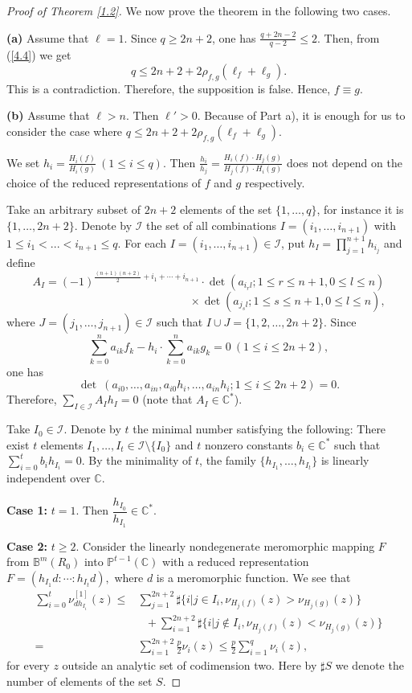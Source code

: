 \documentclass[12pt, a4paper, oneside]{amsart}
\newcommand{\C}{{\mathbb{C}}}
\newcommand{\B}{\mathbb{B}}
\renewcommand{\P}{{\mathbb{P}}}
\numberwithin{equation}{section}
\begin{document}
\begin{proof}[Proof of Theorem \ref{1.2}]
We now prove the theorem in the following two cases.

\noindent
\textbf{(a)} Assume that $\ell=1$. Since $q\ge 2n+2$, one has $\frac{q+2n-2}{q-2}\le 2$. Then, from (\ref{4.4}) we get 
$$q\le 2n+2+2\rho_{f,g}(\ell_f+\ell_g).$$
This is a contradiction. Therefore, the supposition is false. Hence, $f\equiv g$. 

\noindent
\textbf{(b)} Assume that $\ell>n$. Then $\ell'>0$. Because of Part a), it is enough for us to consider the case where $q\le 2n+2+2\rho_{f,g}(\ell_f+\ell_g).$

We set $h_i=\frac {H_i(f)}{H_i(g)}\ (1\le i\le q).$ Then
$\frac {h_i}{h_j} = \frac {H_i(f)\cdot H_j(g)}{H_j(f)\cdot H_i(g)}$
does not depend on the choice of the reduced representations of $f$ and $g$ respectively.

Take an arbitrary subset of $2n+2$ elements of the set $\{1,\ldots,q\}$, for instance it is $\{1,\ldots,2n+2\}$.
Denote by $\mathcal {I}$ the set of all combinations $I=(i_1,\ldots,i_{n+1})$ with $1\le i_1<...<i_{n+1}\le q$. For each $I=(i_1,\ldots,i_{n+1})\in \mathcal {I}$, put $h_I=\prod_{j=1}^{n+1}h_{i_j}$ and define 
$$A_I=(-1)^{\frac {(n+1)(n+2)}{2}+i_1+\cdots+i_{n+1}}\cdot \det (a_{i_rl};1\le r \le n+1,0\le l \le n)$$
$$\quad\quad\quad\quad\quad\quad\quad \quad\quad\quad\quad\quad\quad\quad\times\det (a_{j_sl};1\le s \le n+1,0\le l \le n),$$
where $J=(j_1,\ldots,j_{n+1})\in \mathcal {I}$ such that $I \cup J =\{1,2,\ldots,2n+2\}.$
Since 
$$\sum_{k=0}^n a_{ik}f_{k}-h_i\cdot \sum_{k=0}^n a_{ik}g_{k}=0\ (1\le i \le 2n+2),$$ 
one has
$$\det \ (a_{i0},\ldots,a_{in},a_{i0}h_i,\ldots,a_{in}h_i; 1\le i \le 2n+2)=0.$$
Therefore, $\sum_{I\in \mathcal {I}}A_Ih_I=0$ (note that $A_I\in\C^*$).

Take $I_0\in \mathcal {I}$. Denote by $t$ the minimal number satisfying the following: 
There exist $t$ elements $I_1,\ldots,I_t \in \mathcal {I}\setminus \{I_0\}$ and $t$ nonzero constants $b_i \in 
\C^*$ such that $\sum_{i=0}^tb_ih_{I_i}=0.$
By the minimality of $t$, the family $\{h_{I_1},\ldots,h_{I_t}\}$ is linearly independent over $\C$.

{\bf Case 1:} $t=1$. Then $\dfrac {h_{I_0}}{h_{I_1}}\in\C^*.$

{\bf Case 2:} $t\ge 2.$  Consider the linearly nondegenerate meromorphic mapping $F$ from $\B^m(R_0)$ into $\P^{t-1}(\C)$ with a reduced representation
$F=(h_{I_1}d:\cdots :h_{I_t}d),$ where $d$ is a meromorphic function. We see that
\begin{align*}
\sum_{i=0}^t\nu_{d h_{I_i}}^{[1]}(z)\le&\sum_{j=1}^{2n+2}\sharp\{i|j\in I_i,\nu_{H_j(f)}(z)>\nu_{H_j(g)}(z)\}\\
&\ \ \ +\sum_{i=1}^{2n+2}\sharp\{i|j\not\in I_i,\nu_{H_j(f)}(z)<\nu_{H_j(g)}(z)\}\\
=&\sum_{i=1}^{2n+2}\frac{p}{2}\nu_i(z)\le\frac{p}{2}\sum_{i=1}^q\nu_i(z),
\end{align*}
for every $z$ outside an analytic set of codimension two. Here by $\sharp S$ we denote the number of elements of the set $S$.


\end{proof}
\end{document}
